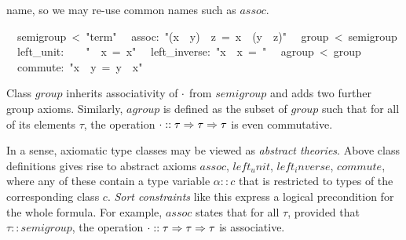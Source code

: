 \begin{isabelle}
\begin{isamarkuptext}
 name, so we may re-use common names such as $assoc$.%
\end{isamarkuptext}%
\isanewline
\ \ semigroup\ <\ {"}term{"}\isanewline
\ \ assoc:\ {"}(x\ {\isasymOtimes}\ y)\ {\isasymOtimes}\ z\ =\ x\ {\isasymOtimes}\ (y\ {\isasymOtimes}\ z){"}\isanewline
\isanewline
{}\isanewline
\ \ group\ <\ semigroup\isanewline
\ \ left\_unit:\ \ \ \ {"}{\isasymunit}\ {\isasymOtimes}\ x\ =\ x{"}\isanewline
\ \ left\_inverse:\ {"}x{\isasyminv}\ {\isasymOtimes}\ x\ =\ {\isasymunit}{"}\isanewline
\isanewline
{}\isanewline
\ \ agroup\ <\ group\isanewline
\ \ commute:\ {"}x\ {\isasymOtimes}\ y\ =\ y\ {\isasymOtimes}\ x{"}%
\begin{isamarkuptext}%
\noindent Class $group$ inherits associativity of $\cdot$ from
 $semigroup$ and adds two further group axioms. Similarly, $agroup$
 is defined as the subset of $group$ such that for all of its elements
 $\tau$, the operation $\cdot :: \tau \Rightarrow \tau \Rightarrow \tau$ is even
 commutative.%
\end{isamarkuptext}%
%
%
\begin{isamarkuptext}%
In a sense, axiomatic type classes may be viewed as \emph{abstract
 theories}.  Above class definitions gives rise to abstract axioms
 $assoc$, $left_unit$, $left_inverse$, $commute$, where any of these
 contain a type variable $\alpha :: c$ that is restricted to types of
 the corresponding class $c$.  \emph{Sort constraints} like this
 express a logical precondition for the whole formula.  For example,
 $assoc$ states that for all $\tau$, provided that $\tau ::
 semigroup$, the operation $\cdot :: \tau \Rightarrow \tau \Rightarrow \tau$ is
 associative.


\end{isamarkuptext}
\end{isabelle}
